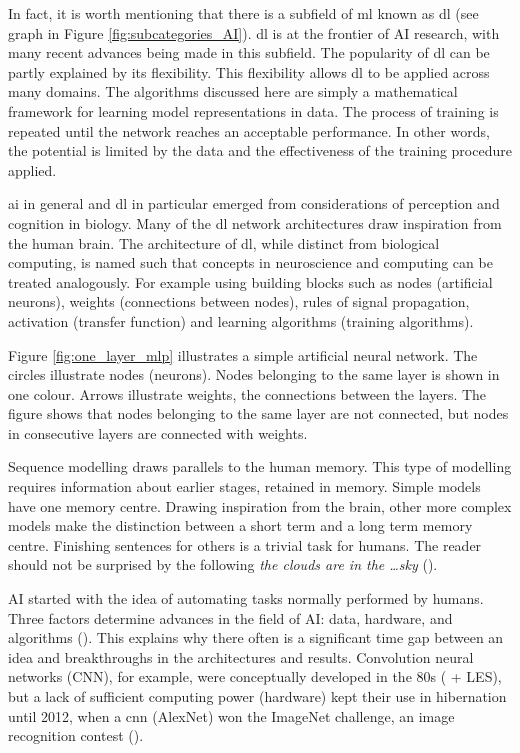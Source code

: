 In fact, it is worth mentioning that there is a subfield of \acrshort{ml} known as \acrshort{dl} (see graph in Figure \ref{fig:subcategories_AI}). 
\acrshort{dl} is at the frontier of AI research, with many recent advances being made in this subfield. The popularity of \acrshort{dl} can be partly explained by its flexibility. This flexibility allows \acrshort{dl} to be applied across many domains. The algorithms discussed here are simply a mathematical framework for learning model representations in data. The process of training is repeated until the network reaches an acceptable performance. In other words, the potential is limited by the data and the effectiveness of the training procedure applied.


\acrshort{ai} in general and \acrshort{dl} in particular emerged from considerations of perception and cognition in biology. Many of the \acrshort{dl} network architectures draw inspiration from the human brain. The architecture of \acrshort{dl}, while distinct from biological computing, is named such that concepts in neuroscience and computing can be treated analogously. For example using building blocks such as nodes (artificial neurons), weights (connections between nodes), rules of signal propagation, activation (transfer function) and learning algorithms (training algorithms).

Figure \ref{fig:one_layer_mlp} illustrates a simple artificial neural network. The circles illustrate nodes (neurons). Nodes belonging to the same layer is shown in one colour. Arrows illustrate weights, the connections between the layers. The figure shows that nodes belonging to the same layer are not connected, but nodes in consecutive layers are connected with weights. 

Sequence modelling draws parallels to the human memory. This type of modelling requires information about earlier stages, retained in memory. Simple models have one memory centre. Drawing inspiration from the brain, other more complex models make the distinction between a short term and a long term memory centre. Finishing sentences for others is a trivial task for humans. The reader should not be surprised by the following \textit{the clouds are in the \ldots sky} (\cite{colah_blog_post}).

AI started with the idea of automating tasks normally performed by humans. Three factors determine advances in the field of AI: data, hardware, and algorithms (\cite{chollet_book}). This explains why there often is a significant time gap between an idea and breakthroughs in the architectures and results. Convolution neural networks (CNN), for example, were conceptually developed in the 80s (\cite{fukushima_neocognitron:_1980} + LES), but a lack of sufficient computing power (hardware) kept their use in hibernation until 2012, when a \acrshort{cnn} (AlexNet) won the ImageNet challenge, an image recognition contest (\cite{AlexNet}).

